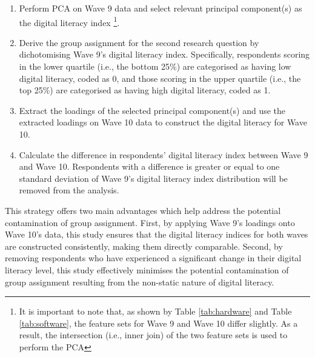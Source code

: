 \begin{enumerate}
    \item Perform PCA on Wave 9 data and select relevant principal component(s) as the digital literacy index \footnote{It is important to note that, as shown by Table \ref{tab:hardware} and Table \ref{tab:software}, the feature sets for Wave 9 and Wave 10 differ slightly. As a result, the intersection (i.e., inner join) of the two feature sets is used to perform the PCA}.
    \item Derive the group assignment for the second research question by dichotomising Wave 9's digital literacy index. Specifically, respondents scoring in the lower quartile (i.e., the bottom 25\%) are categorised as having low digital literacy, coded as 0, and those scoring in the upper quartile (i.e., the top 25\%) are categorised as having high digital literacy, coded as 1.
    \item Extract the loadings of the selected principal component(s) and use the extracted loadings on Wave 10 data to construct the digital literacy for Wave 10.
    \item Calculate the difference in respondents' digital literacy index between Wave 9 and Wave 10. Respondents with a difference is greater or equal to one standard deviation of Wave 9's digital literacy index distribution will be removed from the analysis. 
\end{enumerate}

This strategy offers two main advantages which help address the potential contamination of group assignment. First, by applying Wave 9's loadings onto Wave 10's data, this study ensures that the digital literacy indices for both waves are constructed consistently, making them directly comparable. Second, by removing respondents who have experienced a significant change in their digital literacy level, this study effectively minimises the potential contamination of group assignment resulting from the non-static nature of digital literacy.

